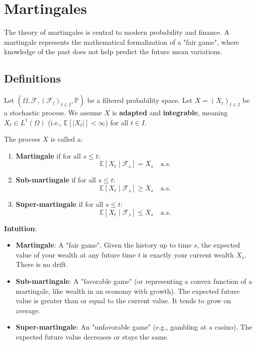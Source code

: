 \chapter{Martingales}

The theory of martingales is central to modern probability and finance. A martingale represents the mathematical formalization of a "fair game", where knowledge of the past does not help predict the future mean variations.

\section{Definitions}

Let $(\Omega, \mathcal{F}, (\mathcal{F}_t)_{t \in I}, \mathbb{P})$ be a filtered probability space. Let $X = (X_t)_{t \in I}$ be a stochastic process.
We assume $X$ is \textbf{adapted} and \textbf{integrable}, meaning $X_t \in L^1(\Omega)$ (i.e., $\mathbb{E}[|X_t|] < \infty$) for all $t \in I$.

\begin{definition}
The process $X$ is called a:
\begin{enumerate}
    \item \textbf{Martingale} if for all $s \le t$:
    \[
    \mathbb{E}[X_t \mid \mathcal{F}_s] = X_s \quad \text{a.s.}
    \]
    \item \textbf{Sub-martingale} if for all $s \le t$:
    \[
    \mathbb{E}[X_t \mid \mathcal{F}_s] \ge X_s \quad \text{a.s.}
    \]
    \item \textbf{Super-martingale} if for all $s \le t$:
    \[
    \mathbb{E}[X_t \mid \mathcal{F}_s] \le X_s \quad \text{a.s.}
    \]
\end{enumerate}
\end{definition}

\textbf{Intuition}:
\begin{itemize}
    \item \textbf{Martingale}: A "fair game". Given the history up to time $s$, the expected value of your wealth at any future time $t$ is exactly your current wealth $X_s$. There is no drift.
    \item \textbf{Sub-martingale}: A "favorable game" (or representing a convex function of a martingale, like wealth in an economy with growth). The expected future value is greater than or equal to the current value. It tends to grow on average.
    \item \textbf{Super-martingale}: An "unfavorable game" (e.g., gambling at a casino). The expected future value decreases or stays the same.
\end{itemize}

